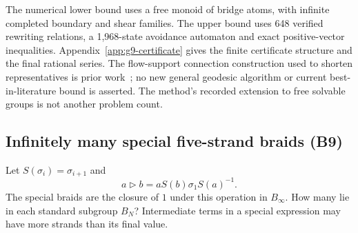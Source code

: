 The numerical lower bound uses a free monoid of bridge atoms, with
infinite completed boundary and shear families. The upper bound uses
648 verified rewriting relations, a 1,968-state avoidance automaton
and exact positive-vector inequalities. Appendix~\ref{app:g9-certificate}
gives the finite certificate structure and the final rational series.
The flow-support connection construction used to shorten representatives
is prior work~\cite[Section 2.7]{mruv}; no new general geodesic algorithm
or current best-in-literature bound is asserted. The method's recorded
extension to free solvable groups is not another problem count.

\subsection{Infinitely many special five-strand braids (B9)}\label{sec:b9}
Let $S(\sigma_i)=\sigma_{i+1}$ and
\[
 a\mathbin{\triangleright}b=aS(b)\sigma_1S(a)^{-1}.
\]
The special braids are the closure of $1$ under this operation in
$B_\infty$. How many lie in each standard subgroup $B_N$?
Intermediate terms in a special expression may have more strands
than its final value.

